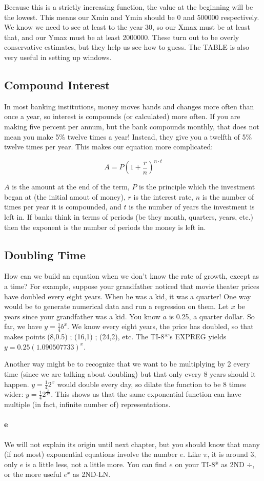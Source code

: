 Because this is a strictly increasing function, the value at the beginning will be 
the lowest.  This means our Xmin and Ymin should be 0 and 500000 respectively.
We know we need to see at least to the year 30, so our Xmax must be at least that,
and our Ymax must be at least 2000000.  These turn out to be overly conservative
estimates, but they help us see how to guess.  The TABLE is also very useful in
setting up windows.

\subsection{Compound Interest}
In most banking institutions, money moves hands and changes more often than once
a year, so interest is compounds (or calculated) more often.  If you are making
five percent per annum, but the bank compounds monthly, that does not mean you
make 5\% twelve times a year!   Instead, they give you a twelfth of 5\% twelve times
per year.  This makes our equation more complicated:

$$
A = P\left(1+\frac{r}{n}\right)^{n\cdot{}t}
$$

$A$ is the amount at the end of the term, $P$ is the principle which the investment began
at (the initial amout of money), $r$ is the interest rate, $n$ is the number of times per year
it is compounded, and $t$ is the number of years the investment is left in.  If banks think
in terms of periods (be they month, quarters, years, etc.) then the exponent is the number
of periods the money is left in.


\subsection{Doubling Time}
How can we build an equation when we don't know the rate of growth, except as a time?
For example, suppose your grandfather noticed that movie theater prices have doubled 
every eight years.  When he was a kid, it was a quarter!  One way would be to generate
numerical data and run a regression on them.  Let $x$ be years since your grandfather
was a kid.  You know $a$ is 0.25, a quarter dollar.  So far, we have $y=\frac{1}{4}b^x$.
We know every eight years, the price has doubled, so that makes points (8,0.5) ; (16,1)
; (24,2), etc.  The TI-8*'s EXPREG yields $y=0.25(1.090507733)^x$.

Another way might be to recognize that we want to be multiplying by 2 every time (since
we are talking about doubling) but that only every 8 years should it happen.
$y=\frac{1}{4}2^x$ would double every day, so dilate the function to be 8 times wider:
$y=\frac{1}{4}2^\frac{x}{12}$.  This shows us that the same exponential function
can have multiple (in fact, infinite number of) representations.

\paragraph{e}
We will not explain its origin until next chapter, but you should know that many (if not most)
exponential equations involve the number $e$.  Like $\pi$, it is around 3, only $e$ is a little less,
not a little more.  You can find $e$ on your TI-8* as 2ND $\div$, or the more useful $e^x$
as 2ND-LN.